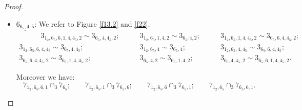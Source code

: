 \documentclass{amsart}
\theoremstyle{definition}
\theoremstyle{remark}
\begin{document}
\begin{proof}
\begin{itemize}
    Moreover we have:
    $$
           7_{1_2,6,1} \cap_3 7; \quad \quad
             7_{1_2,1} \cap_3 7_6; \quad \quad
             7_{1_2,6} \cap_3 7_1; \quad \quad
             7_{1_2} \cap_3 7_{6,1}.
    $$

    \item $\underline{6_{6_5,4,5}}$: We refer to Figure \ref{f13.2} and \ref{f22}.
    \begin{align*}
            \quad \quad \quad 3_{1_2,6_5,6,1,4,4_5,2} \sim 3_{6_5,4,4_5,2}; \quad \quad
            & 3_{1_2,6_5,1,4,2} \sim 3_{6_5,4,2}; \quad \quad
            & 3_{1_2,6_5,1,4,4_5,2} \sim 3_{6_5,6,4,4_5,2}; \\
            3_{1_2,6_5,6,4,4_5} \sim 3_{6_5,4,4_5}; \quad \quad
            & 3_{1_2,6_5,4} \sim 3_{6_5,4}; \quad \quad
            & 3_{1_2,6_5,4,4_5} \sim 3_{6_5,6,4,4_5}; \\
            3_{6_5,6,4,4_5,2} \sim 3_{6_5,1,4,4_5,2}; \quad \quad
            & 3_{6_5,4,2} \sim 3_{6_5,1,4,2}; \quad \quad
            & 3_{6_5,4,4_5,2} \sim 3_{6_5,6,1,4,4_5,2}.
    \end{align*}

    Moreover we have:
    $$
           7_{1_2,6_5,6,1} \cap_3 7_{6_5}; \quad \quad
             7_{1_2,6_5,1} \cap_3 7_{6_5,6}; \quad \quad
             7_{1_2,6_5,6} \cap_3 7_{6_5,1}; \quad \quad
             7_{1_2,6_5} \cap_3 7_{6_5,6,1}.
    $$



\end{itemize}
\end{proof}
\end{document}
